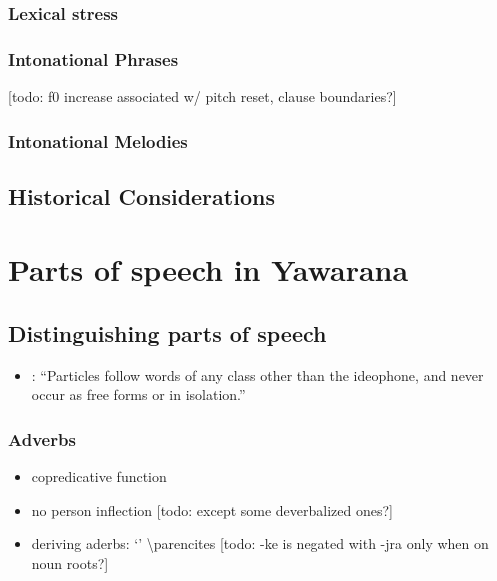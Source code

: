 \documentclass{memoir}
\begin{document}
\subsection{\texorpdfstring{Lexical stress
\label{sec:stress}}{Lexical stress }}

\subsection{\texorpdfstring{Intonational Phrases
\label{sec:intphrases}}{Intonational Phrases }}

{[}todo: f0 increase associated w/ pitch reset, clause boundaries?{]}

\subsection{\texorpdfstring{Intonational Melodies
\label{sec:intmelodies}}{Intonational Melodies }}

\section{\texorpdfstring{Historical Considerations
\label{sec:histphono}}{Historical Considerations }}

\chapter{\texorpdfstring{Parts of speech in Yawarana
\label{POS}}{Parts of speech in Yawarana }}

\section{Distinguishing parts of speech}

\begin{itemize}
\tightlist
\item
  \textcites[111]{koehn1986apalai}: ``Particles follow words of any
  class other than the ideophone, and never occur as free forms or in
  isolation.''
\end{itemize}

\subsection{Adverbs}

\begin{itemize}
\tightlist
\item
  copredicative function
\item
  no person inflection {[}todo: except some deverbalized ones?{]}
\item
  deriving aderbs:  `' \textbackslash parencites
  {[}todo: -ke is negated with -jra only when on noun roots?{]}
\end{itemize}
\end{document}
